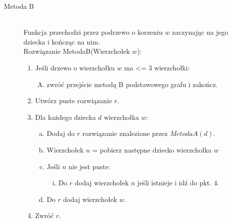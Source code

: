 \begin{description}
\begin{description}
	\item[Metoda B] \hfill \\ 
	Funkcja przechodzi przez podrzewo o korzeniu $w$ zaczynając na jego dziecka i kończąc na nim.\\
	Rozwiązanie MetodaB(Wierzchołek $w$):
	\begin{enumerate}[1.]
		\item Jeśli drzewo o wierzchołku $w$ ma <= 3 wierzchołki:
				\begin{enumerate}[A.]
				\item zwróć przejście metodą B podstawowego grafu i zakończ.
				\end{enumerate}
		\item Utwórz puste rozwiązanie $r$.
		\item Dla każdego dziecka $d$ wierzchołka $w$:
			\begin{enumerate}[a.]
			\item Dodaj do $r$ rozwiązanie znalezione przez $MetodaA(d)$.
			\item Wierzchołek $n$ = pobierz następne dziecko wierzchołka $w$
			\item Jeśli $n$ nie jest puste:
				\begin{enumerate}[i.]
				\item Do $r$ dodaj wierzchołek $n$ jeśli istnieje i idź do pkt. 4.
				\end{enumerate}
			\item Do $r$ dodaj wierzchołek $w$.
			\end{enumerate}
		\item Zwróć $r.$
	\end{enumerate}

	\end{description}

\end{description}